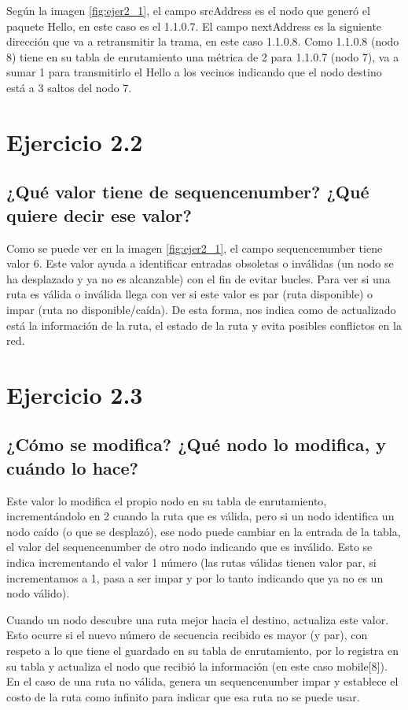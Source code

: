 Según la imagen \ref{fig:ejer2_1}, el campo srcAddress es el nodo que generó el paquete Hello, en este caso es el 1.1.0.7. El campo nextAddress es la siguiente dirección que va a retransmitir la trama, en este caso 1.1.0.8. Como 1.1.0.8 (nodo 8) tiene en su tabla de enrutamiento una métrica de 2 para 1.1.0.7 (nodo 7), va a sumar 1 para transmitirlo el Hello a los vecinos indicando que el nodo destino está a 3 saltos del nodo 7.



\section{Ejercicio 2.2}

\subsection{¿Qué valor tiene de sequencenumber? ¿Qué quiere decir ese valor?}

Como se puede ver en la imagen \ref{fig:ejer2_1}, el campo sequencenumber tiene valor 6. Este valor ayuda a identificar entradas obsoletas o inválidas (un nodo se ha desplazado y ya no es alcanzable) con el fin de evitar bucles. Para ver si una ruta es válida o inválida llega con ver si este valor es par (ruta disponible) o impar (ruta no disponible/caída). De esta forma, nos indica como de actualizado está la información de la ruta, el estado de la ruta y evita posibles conflictos en la red.

\section{Ejercicio 2.3}

\subsection{¿Cómo se modifica? ¿Qué nodo lo modifica, y cuándo lo hace?}

Este valor lo modifica el propio nodo en su tabla de enrutamiento, incrementándolo en 2 cuando la ruta que es válida, pero si un nodo identifica un nodo caído (o que se desplazó), ese nodo puede cambiar en la entrada de la tabla, el valor del sequencenumber de otro nodo indicando que es inválido. Esto se indica incrementando el valor 1 número (las rutas válidas tienen valor par, si incrementamos a 1, pasa a ser impar y por lo tanto indicando que ya no es un nodo válido). 

Cuando un nodo descubre una ruta mejor hacia el destino, actualiza este valor. Esto ocurre si el nuevo número de secuencia recibido es mayor (y par), con respeto a lo que tiene el guardado en su tabla de enrutamiento, por lo registra en su tabla y actualiza el nodo que recibió la información (en este caso mobile[8]). En el caso de una ruta no válida, genera un sequencenumber impar y establece el costo de la ruta como infinito para indicar que esa ruta no se puede usar.

